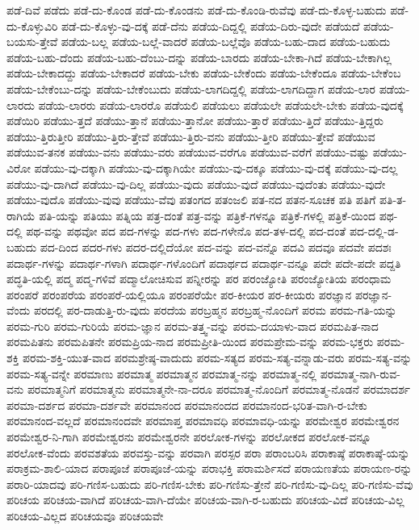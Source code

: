 {ಪಡೆ-ದಿವೆ
ಪಡೆದು
ಪಡೆ-ದು-ಕೊಂಡ
ಪಡೆ-ದು-ಕೊಂಡನು
ಪಡೆ-ದು-ಕೊಂಡಿ-ರುವೆವು
ಪಡೆ-ದು-ಕೊಳ್ಳ-ಬಹುದು
ಪಡೆ-ದು-ಕೊಳ್ಳುವಿರಿ
ಪಡೆ-ದು-ಕೊಳ್ಳು-ವು-ದಕ್ಕೆ
ಪಡೆ-ದೆನು
ಪಡೆಯ-ದಿದ್ದಲ್ಲಿ
ಪಡೆಯ-ದಿರು-ವುದೇ
ಪಡೆಯದೆ
ಪಡೆಯ-ಬಯಸು-ತ್ತೇವೆ
ಪಡೆಯ-ಬಲ್ಲ
ಪಡೆಯ-ಬಲ್ಲೆ-ವಾದರೆ
ಪಡೆಯ-ಬಲ್ಲೆವೊ
ಪಡೆಯ-ಬಹು-ದಾದ
ಪಡೆಯ-ಬಹುದು
ಪಡೆಯ-ಬಹು-ದೆಂದು
ಪಡೆಯ-ಬಹು-ದೆಂಬು-ದನ್ನು
ಪಡೆಯ-ಬಾರದು
ಪಡೆಯ-ಬೇಕಾ-ಗಿದೆ
ಪಡೆಯ-ಬೇಕಾಗಿಲ್ಲ
ಪಡೆಯ-ಬೇಕಾದದ್ದು
ಪಡೆಯ-ಬೇಕಾದರೆ
ಪಡೆಯ-ಬೇಕು
ಪಡೆಯ-ಬೇಕೆಂದು
ಪಡೆಯ-ಬೇಕೆಂದೂ
ಪಡೆಯ-ಬೇಕೆಂಬ
ಪಡೆಯ-ಬೇಕೆಂಬು-ದನ್ನು
ಪಡೆಯ-ಬೇಕೆಂಬುದು
ಪಡೆಯ-ಲಾಗದಿದ್ದಲ್ಲಿ
ಪಡೆಯ-ಲಾಗದಿದ್ದಾಗ
ಪಡೆಯ-ಲಾರ
ಪಡೆಯ-ಲಾರದು
ಪಡೆಯ-ಲಾರರು
ಪಡೆಯ-ಲಾರರೊ
ಪಡೆಯಲಿ
ಪಡೆಯಲು
ಪಡೆಯಲೇ
ಪಡೆಯಲೇ-ಬೇಕು
ಪಡೆಯ-ವುದಕ್ಕೆ
ಪಡೆಯಿರಿ
ಪಡೆಯು-ತ್ತದೆ
ಪಡೆಯು-ತ್ತಾನೆ
ಪಡೆಯು-ತ್ತಾನೋ
ಪಡೆಯು-ತ್ತಾರೆ
ಪಡೆಯು-ತ್ತಿದೆ
ಪಡೆಯು-ತ್ತಿದ್ದರು
ಪಡೆಯು-ತ್ತಿರುತ್ತೀರಿ
ಪಡೆಯು-ತ್ತಿರು-ತ್ತೇವೆ
ಪಡೆಯು-ತ್ತಿರು-ವನು
ಪಡೆಯು-ತ್ತೀರಿ
ಪಡೆಯು-ತ್ತೇವೆ
ಪಡೆಯುವ
ಪಡೆಯುವ-ತನಕ
ಪಡೆಯು-ವನು
ಪಡೆಯು-ವರು
ಪಡೆಯುವ-ವರೆಗೂ
ಪಡೆಯುವ-ವರೆಗೆ
ಪಡೆಯು-ವಷ್ಟು
ಪಡೆಯು-ವಿರೋ
ಪಡೆಯು-ವು-ದಕ್ಕಾಗಿ
ಪಡೆಯು-ವು-ದಕ್ಕಾಗಿಯೇ
ಪಡೆಯು-ವು-ದಕ್ಕೂ
ಪಡೆಯು-ವು-ದಕ್ಕೆ
ಪಡೆಯು-ವು-ದಲ್ಲ
ಪಡೆಯು-ವು-ದಾಗಿದೆ
ಪಡೆಯು-ವು-ದಿಲ್ಲ
ಪಡೆಯು-ವುದು
ಪಡೆಯು-ವುದೆ
ಪಡೆಯು-ವುದೆಂತು
ಪಡೆಯು-ವುದೇ
ಪಡೆಯು-ವುದೊ
ಪಡೆಯು-ವುವು
ಪಡೆಯು-ವೆವು
ಪತಂಗದ
ಪತಂಜಲಿ
ಪತ-ನದ
ಪತನ-ಸೂಚಕ
ಪತಿ
ಪತಿಗೆ
ಪತಿ-ತ-ರಾಗಿಯೆ
ಪತಿ-ಯನ್ನು
ಪತಿಯು
ಪತ್ನಿಯ
ಪತ್ರ-ದಂತೆ
ಪತ್ರ-ವನ್ನು
ಪತ್ರಿಕೆ-ಗಳನ್ನೂ
ಪತ್ರಿಕೆ-ಗಳಲ್ಲಿ
ಪತ್ರಿಕೆ-ಯಿಂದ
ಪಥ-ದಲ್ಲಿ
ಪಥ-ವನ್ನು
ಪಥವೋ
ಪದ
ಪದ-ಗಳನ್ನು
ಪದ-ಗಳು
ಪದ-ಗಳೇನೊ
ಪದ-ತಳ-ದಲ್ಲಿ
ಪದ-ದಂತೆ
ಪದ-ದಲ್ಲಿ-ಡ-ಬಹುದು
ಪದ-ದಿಂದ
ಪದರ-ಗಳು
ಪದರ-ದಲ್ಲಿದೆಯೋ
ಪದ-ವನ್ನು
ಪದ-ವನ್ನೊ
ಪದವಿ
ಪದವೂ
ಪದವೇ
ಪದಶಃ
ಪದಾರ್ಥ-ಗಳನ್ನು
ಪದಾರ್ಥ-ಗಳಾಗಿ
ಪದಾರ್ಥ-ಗಳೊಂದಿಗೆ
ಪದಾರ್ಥದ
ಪದಾರ್ಥ-ವನ್ನೂ
ಪದೇ
ಪದೇ-ಪದೇ
ಪದ್ದತಿ
ಪದ್ಧತಿ-ಯಲ್ಲಿ
ಪದ್ಮ
ಪದ್ಮ-ಗಳಿವೆ
ಪದ್ಮಾಲೋಚಿಸುವ
ಪನ್ನೀರನ್ನು
ಪರ
ಪರಂಜ್ಯೋತಿ
ಪರಂಜ್ಯೋತಿಯ
ಪರಂಧಾಮ
ಪರಂಪರೆ
ಪರಂಪರೆಯ
ಪರಂಪರೆ-ಯಲ್ಲಿಯೂ
ಪರಂಪರೆಯೇ
ಪರ-ಕೀಯರ
ಪರ-ಕೀಯರು
ಪರಜ್ಞಾನ
ಪರಜ್ಞಾನ-ವೆಂದು
ಪರದಲ್ಲಿ
ಪರ-ದಾಡುತ್ತಿ-ರು-ವುದು
ಪರದೆಯ
ಪರಬ್ರಹ್ಮನ
ಪರಬ್ರಹ್ಮ-ನೊಂದಿಗೆ
ಪರಮ
ಪರಮ-ಗತಿ-ಯನ್ನು
ಪರಮ-ಗುರಿ
ಪರಮ-ಗುರಿಯೆ
ಪರಮ-ಜ್ಞಾನ
ಪರಮ-ತತ್ತ್ವ-ವನ್ನು
ಪರಮ-ದಯಾಳು-ವಾದ
ಪರಮಪಿತ-ನಾದ
ಪರಮಪಿತನು
ಪರಮಪಿತನೇ
ಪರಮಪ್ರಿಯ-ನಾದ
ಪರಮಪ್ರೀತಿ-ಯಿಂದ
ಪರಮಪ್ರೇಮ-ವನ್ನು
ಪರಮ-ಭಕ್ತರು
ಪರಮ-ಶಕ್ತಿ
ಪರಮ-ಶಕ್ತಿ-ಯುತ-ವಾದ
ಪರಮಶ್ರೇಷ್ಠ-ವಾದುದು
ಪರಮ-ಸತ್ಯದ
ಪರಮ-ಸತ್ಯ-ವನ್ನಾಡು-ವರು
ಪರಮ-ಸತ್ಯ-ವನ್ನು
ಪರಮ-ಸತ್ಯ-ವನ್ನೇ
ಪರಮಾಣು
ಪರಮಾತ್ಮ
ಪರಮಾತ್ಮನ
ಪರಮಾತ್ಮ-ನನ್ನು
ಪರಮಾತ್ಮ-ನಲ್ಲಿ
ಪರಮಾತ್ಮ-ನಾಗಿ-ರುವ-ವನು
ಪರಮಾತ್ಮನಿಗೆ
ಪರಮಾತ್ಮನು
ಪರಮಾತ್ಮನೇ-ನಾ-ದರೂ
ಪರಮಾತ್ಮ-ನೊಂದಿಗೆ
ಪರಮಾತ್ಮ-ನೊಡನೆ
ಪರಮಾದರ್ಶ
ಪರಮಾ-ದರ್ಶದ
ಪರಮಾ-ದರ್ಶವೇ
ಪರಮಾನಂದ
ಪರಮಾನಂದದ
ಪರಮಾನಂದ-ಭರಿತ-ವಾಗಿ-ರ-ಬೇಕು
ಪರಮಾನಂದ-ವಲ್ಲದೆ
ಪರಮಾನಂದವೇ
ಪರಮಾಪ್ತ
ಪರಮಾವಧಿ
ಪರಮಾವಧಿ-ಯನ್ನು
ಪರಮೇಶ್ವರ
ಪರಮೇಶ್ವರನ
ಪರಮೇಶ್ವರ-ನಿ-ಗಾಗಿ
ಪರಮೇಶ್ವರನು
ಪರಮೇಶ್ವರನೇ
ಪರಲೋಕ-ಗಳನ್ನು
ಪರಲೋಕದ
ಪರಲೋಕ-ವನ್ನೂ
ಪರಲೋಕ-ವೆಂದು
ಪರವಶತೆಯ
ಪರವಸ್ತು-ವನ್ನು
ಪರವಾಗಿ
ಪರಸ್ಪರ
ಪರಾ
ಪರಾಂಬರಿಸಿ
ಪರಾಕಾಷ್ಠೆ
ಪರಾಕಾಷ್ಠೆ-ಯನ್ನು
ಪರಾಕ್ರಮ-ಶಾಲಿ-ಯಾದ
ಪರಾಪೂಜೆ
ಪರಾಪೂಜೆ-ಯನ್ನು
ಪರಾಭಕ್ತಿ
ಪರಾಮರ್ಶಿಸದೆ
ಪರಾಯಣತೆಯ
ಪರಾಯಣ-ರನ್ನು
ಪರಾರಿ-ಯಾದವು
ಪರಿ-ಗಣಿಸ-ಬಹುದು
ಪರಿ-ಗಣಿಸ-ಬೇಕು
ಪರಿ-ಗಣಿಸು-ತ್ತೇನೆ
ಪರಿ-ಗಣಿಸು-ವು-ದಿಲ್ಲ
ಪರಿ-ಗಣಿಸು-ವೆವು
ಪರಿಚಯ
ಪರಿಚಯ-ವಾಗಿದೆ
ಪರಿಚಯ-ವಾಗಿ-ದೆಯೇ
ಪರಿಚಯ-ವಾಗಿ-ರ-ಬಹುದು
ಪರಿಚಯ-ವಿದೆ
ಪರಿಚಯ-ವಿಲ್ಲ
ಪರಿಚಯ-ವಿಲ್ಲದ
ಪರಿಚಯವೂ
ಪರಿಚಯವೇ
}
